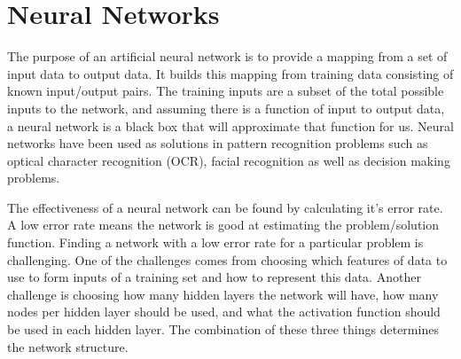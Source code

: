 \chapter[Neural Networks]{Neural Networks}
The purpose of an artificial neural network is to provide a mapping from a set of input data to output data. It builds this mapping from training data consisting of known input/output pairs. The training inputs are a subset of the total possible inputs to the network, and assuming there is a function of input to output data, a neural network is a black box that will approximate that function for us. Neural networks have been used as solutions in  pattern recognition problems such as optical character recognition (OCR), facial recognition as well as decision making problems.

The effectiveness of a neural network can be found by calculating it's error rate. A low error rate means the network is good at estimating the problem/solution function. Finding a network with a low error rate for a particular problem is challenging. One of the challenges comes from choosing which features of data to use to form inputs of a training set and how to represent this data. Another challenge is choosing how many hidden layers the network will have, how many nodes per hidden layer should be used, and what the activation function should be used in each hidden layer. The combination of these three things determines the network structure. 